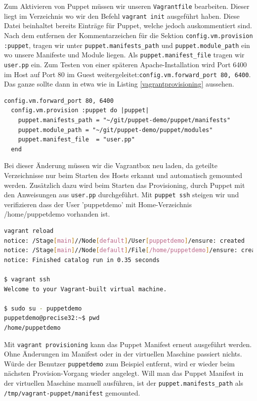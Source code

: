 \documentclass[12pt,a4paper,ngerman]{article}
\begin{document}
Zum Aktivieren von Puppet müssen wir unseren \lstinline$Vagrantfile$ bearbeiten. Dieser liegt im Verzeichnis wo wir den Befehl \lstinline$vagrant init$ ausgeführt haben. Diese Datei beinhaltet bereits Einträge für Puppet, welche jedoch auskommentiert sind. Nach dem entfernen der Kommentarzeichen für die Sektion \lstinline$config.vm.provision :puppet$, tragen wir unter \lstinline$puppet.manifests_path$ und \lstinline$puppet.module_path$ ein wo unsere Manifeste und Module liegen. Als \lstinline$puppet.manifest_file$ tragen wir \lstinline$user.pp$ ein. Zum Testen von einer späteren Apache-Installation wird Port 6400 im Host auf Port 80 im Guest weitergeleitet:\lstinline$config.vm.forward_port 80, 6400$. Das ganze sollte dann in etwa wie in Listing \ref{vagrantprovisioning} aussehen.
  
\begin{lstlisting}[language=vagrant,caption=Puppet Provisioning in Vagrantfile konfigurieren, label=vagrantprovisioning]
  config.vm.forward_port 80, 6400  
  config.vm.provision :puppet do |puppet|
    puppet.manifests_path = "~/git/puppet-demo/puppet/manifests"
    puppet.module_path = "~/git/puppet-demo/puppet/modules"
    puppet.manifest_file  = "user.pp"
  end
\end{lstlisting} 

Bei dieser Änderung müssen wir die Vagrantbox neu laden, da geteilte Verzeichnisse nur beim Starten des Hosts erkannt und automatisch gemounted werden. Zusätzlich dazu wird beim Starten das Provisioning, durch Puppet mit den Anweisungen aus \lstinline$user.pp$ durchgeführt. Mit \lstinline$puppet ssh$ steigen wir und verifizieren dass der User 'puppetdemo' mit Home-Verzeichnis /home/puppetdemo vorhanden ist.

\begin{lstlisting}[language=sh,caption=Vagrant Box neu laden, label=vagrant-reload]
vagrant reload
notice: /Stage[main]//Node[default]/User[puppetdemo]/ensure: created
notice: /Stage[main]//Node[default]/File[/home/puppetdemo]/ensure: created
notice: Finished catalog run in 0.35 seconds

$ vagrant ssh
Welcome to your Vagrant-built virtual machine.

$ sudo su - puppetdemo
puppetdemo@precise32:~$ pwd
/home/puppetdemo
\end{lstlisting}

Mit \lstinline$vagrant provisioning$ kann das Puppet Manifest erneut ausgeführt werden. Ohne Änderungen im Manifest oder in der virtuellen Maschine passiert nichts. Würde der Benutzer \lstinline$puppetdemo$ zum Beispiel entfernt, wird er wieder beim nächsten Provision-Vorgang wieder angelegt.
Will man das Puppet Manifest in der virtuellen Maschine manuell ausführen, ist der \lstinline$puppet.manifests_path$ als \lstinline$/tmp/vagrant-puppet/manifest$ gemounted.
\end{document}
